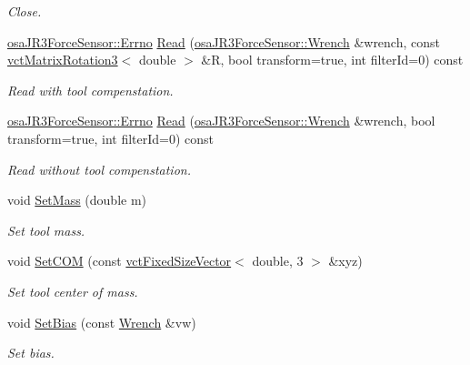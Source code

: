 \begin{DoxyCompactItemize}
\begin{DoxyCompactList}\small\item\em Close. \end{DoxyCompactList}\item 
\hyperlink{classosa_j_r3_force_sensor_a6b27d3a601fae1547fb13d2a4ef97e4a}{osa\+J\+R3\+Force\+Sensor\+::\+Errno} \hyperlink{classosa_j_r3_force_sensor_a8041232529b96e4e6c14a8d342767e12}{Read} (\hyperlink{classosa_j_r3_force_sensor_afcfc2ba175b2e7ef9f86c6394c8966d2}{osa\+J\+R3\+Force\+Sensor\+::\+Wrench} \&wrench, const \hyperlink{classvct_matrix_rotation3}{vct\+Matrix\+Rotation3}$<$ double $>$ \&R, bool transform=true, int filter\+Id=0) const 
\begin{DoxyCompactList}\small\item\em Read with tool compenstation. \end{DoxyCompactList}\item 
\hyperlink{classosa_j_r3_force_sensor_a6b27d3a601fae1547fb13d2a4ef97e4a}{osa\+J\+R3\+Force\+Sensor\+::\+Errno} \hyperlink{classosa_j_r3_force_sensor_a8069da1821ef785d814e23fada35de30}{Read} (\hyperlink{classosa_j_r3_force_sensor_afcfc2ba175b2e7ef9f86c6394c8966d2}{osa\+J\+R3\+Force\+Sensor\+::\+Wrench} \&wrench, bool transform=true, int filter\+Id=0) const 
\begin{DoxyCompactList}\small\item\em Read without tool compenstation. \end{DoxyCompactList}\item 
void \hyperlink{classosa_j_r3_force_sensor_ad80028c63a3b07cb6fea44cc69807f57}{Set\+Mass} (double m)
\begin{DoxyCompactList}\small\item\em Set tool mass. \end{DoxyCompactList}\item 
void \hyperlink{classosa_j_r3_force_sensor_adcd3aac623182a94868d24c93a7b3354}{Set\+C\+O\+M} (const \hyperlink{classvct_fixed_size_vector}{vct\+Fixed\+Size\+Vector}$<$ double, 3 $>$ \&xyz)
\begin{DoxyCompactList}\small\item\em Set tool center of mass. \end{DoxyCompactList}\item 
void \hyperlink{classosa_j_r3_force_sensor_a88981a59351ff9f5f17d14e489b0ed04}{Set\+Bias} (const \hyperlink{classosa_j_r3_force_sensor_afcfc2ba175b2e7ef9f86c6394c8966d2}{Wrench} \&vw)
\begin{DoxyCompactList}\small\item\em Set bias. \end{DoxyCompactList}\item 

\end{DoxyCompactItemize}
